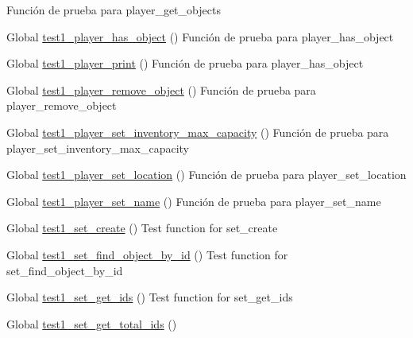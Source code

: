 \begin{DoxyRefList}
%
Función de prueba para player\+\_\+get\+\_\+objects  
\item[Global \mbox{\hyperlink{player__test_8c_abedc0e75ebffb4e7224f5e5ac0ee3055}{test1\+\_\+player\+\_\+has\+\_\+object}} ()]\label{test__test000149}%
%
Función de prueba para player\+\_\+has\+\_\+object  
\item[Global \mbox{\hyperlink{player__test_8c_a7783d860e6e5f7c28befc5d2d30af08b}{test1\+\_\+player\+\_\+print}} ()]\label{test__test000157}%
%
Función de prueba para player\+\_\+has\+\_\+object  
\item[Global \mbox{\hyperlink{player__test_8c_a0685839b423f685dcdabb7b9fe411cd1}{test1\+\_\+player\+\_\+remove\+\_\+object}} ()]\label{test__test000141}%
%
Función de prueba para player\+\_\+remove\+\_\+object  
\item[Global \mbox{\hyperlink{player__test_8c_aed1d8026a0c56c42a1a9d89b887a5e4d}{test1\+\_\+player\+\_\+set\+\_\+inventory\+\_\+max\+\_\+capacity}} ()]\label{test__test000154}%
%
Función de prueba para player\+\_\+set\+\_\+inventory\+\_\+max\+\_\+capacity  
\item[Global \mbox{\hyperlink{player__test_8c_aec6799a4f46c3f3c471fcb668addcad4}{test1\+\_\+player\+\_\+set\+\_\+location}} ()]\label{test__test000144}%
%
Función de prueba para player\+\_\+set\+\_\+location  
\item[Global \mbox{\hyperlink{player__test_8c_a9d87c09e6af910d695265e3fd77ae3a2}{test1\+\_\+player\+\_\+set\+\_\+name}} ()]\label{test__test000128}%
%
Función de prueba para player\+\_\+set\+\_\+name  
\item[Global \mbox{\hyperlink{set__test_8c_a6f654ab4b44e8a9b9cedfb78c378a5d7}{test1\+\_\+set\+\_\+create}} ()]\label{test__test000160}%
%
Test function for set\+\_\+create  
\item[Global \mbox{\hyperlink{set__test_8c_a4e1cb4b064b88a074cc4e144827d03dd}{test1\+\_\+set\+\_\+find\+\_\+object\+\_\+by\+\_\+id}} ()]\label{test__test000179}%
%
Test function for set\+\_\+find\+\_\+object\+\_\+by\+\_\+id  
\item[Global \mbox{\hyperlink{set__test_8c_a5121f8a96087a7f941ffb785d3f826c9}{test1\+\_\+set\+\_\+get\+\_\+ids}} ()]\label{test__test000193}%
%
Test function for set\+\_\+get\+\_\+ids  
\item[Global \mbox{\hyperlink{set__test_8c_a31f1c6b37046c1c8d8fc6175ce78f175}{test1\+\_\+set\+\_\+get\+\_\+total\+\_\+ids}} ()]\label{test__test000173}%

\end{DoxyRefList}
